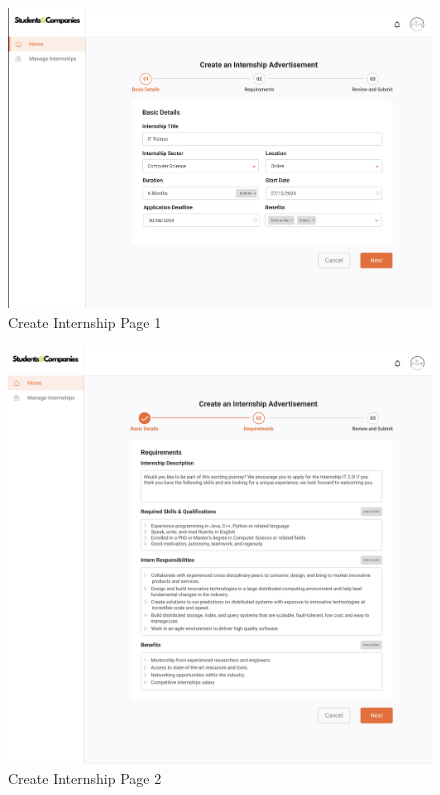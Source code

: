 \documentclass[a4paper,12pt]{article}
\begin{document}
\begin{figure}[H]
    \centering
    \includegraphics[scale = 0.42]{figures/UserInterfaces/Company/CreateInternship1.png}
    \caption{Create Internship Page 1}
     \centering
\end{figure}
\begin{figure}[H]
    \centering
    \includegraphics[scale = 0.40]{figures/UserInterfaces/Company/CreateInternship2.png}
    \caption{Create Internship Page 2}
     \centering
\end{figure}
\end{document}
